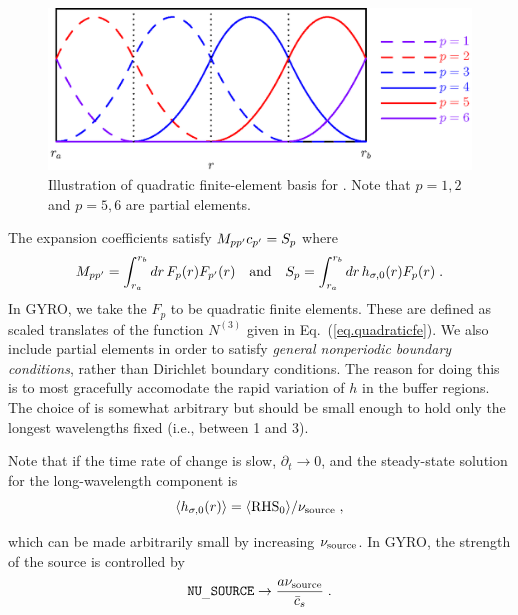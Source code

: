 \begin{figure}
\begin{center}
\includegraphics[scale=1.0]{figures/source.eps}
\caption{Illustration of quadratic finite-element basis for
  .  Note that $p=1,2$ and $p=5,6$ are 
partial elements.}
\label{fig.source}
\end{center}
\end{figure}

\noindent
The expansion coefficients satisfy $M_{pp^\prime} c_{p^\prime} = S_p$ where
%
\begin{equation}
M_{pp^\prime} = \int_{r_a}^{r_b} dr \, F_p(r) F_{p^\prime}(r) 
\quad\mbox{and}\quad
S_p = \int_{r_a}^{r_b} dr \,h_{\sigma,0}(r) F_p(r) \; . 
\end{equation}
In GYRO, we take the $F_p$ to be quadratic finite elements.  These 
are defined as scaled translates of the function $N^{(3)}$ given in 
Eq.~(\ref{eq.quadraticfe}).  We also include partial elements in
order to satisfy {\it general nonperiodic boundary conditions}, 
rather than Dirichlet boundary conditions.  The reason for doing this 
is to most gracefully accomodate the rapid variation of $h$ in 
the buffer regions. The choice of  is somewhat 
arbitrary but should be small enough to hold only the longest 
wavelengths fixed (i.e., between 1 and 3).

Note that if the time rate of change is slow, $\partial_t \rightarrow 0$, 
and the steady-state solution for the long-wavelength component is 
%
\begin{equation}
 \langle h_{\sigma,0}(r) \rangle = 
  \langle \mbox{RHS}_0\rangle /\nu_{\rm source} \; ,
\end{equation}

\noindent
which can be made arbitrarily small by increasing $\nu_{\rm source}$.
In GYRO, the strength of the source is controlled by  
%
\begin{equation}
{\tt NU_\_SOURCE} 
  \rightarrow \frac{a \nu_{\rm source}}{\bar{c}_s} \; . 
\end{equation}

